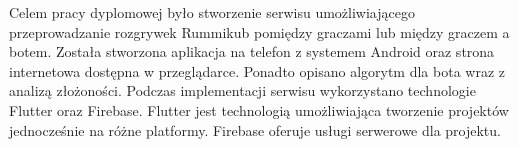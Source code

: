 \begin{streszczenie}
Celem pracy dyplomowej było stworzenie serwisu umożliwiającego przeprowadzanie rozgrywek Rummikub pomiędzy graczami lub między graczem a botem. Została stworzona aplikacja na telefon z systemem Android oraz strona internetowa dostępna w przeglądarce. Ponadto opisano algorytm dla bota wraz z analizą złożoności. Podczas implementacji serwisu wykorzystano technologie Flutter oraz Firebase. Flutter jest technologią umożliwiająca tworzenie projektów jednocześnie na różne platformy. Firebase oferuje usługi serwerowe dla projektu.
\end{streszczenie}
